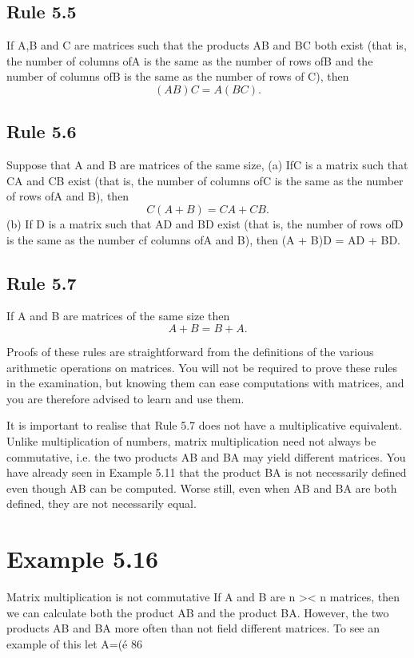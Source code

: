 ﻿\documentclass{beamer}
\begin{document}
\subsection{Rule 5.5} If A,B and C are matrices such that the products AB and BC
both exist (that is, the number of columns ofA is the same as the
number of rows ofB and the number of columns ofB is the same as
the number of rows of C), then
\[(AB)C = A(BC).\]
\subsection{Rule 5.6} Suppose that A and B are matrices of the same size,
(a) IfC is a matrix such that CA and CB exist (that is, the number of
columns ofC is the same as the number of rows ofA and B), then
\[C(A+ B) = CA+CB.\]
(b) If D is a matrix such that AD and BD exist (that is, the number
of rows ofD is the same as the number cf columns ofA and B),
then
(A + B)D = AD + BD.
\subsection{Rule 5.7} If A and B are matrices of the same size then
\[A + B = B + A.\]

Proofs of these rules are straightforward from the deﬁnitions of the
various arithmetic operations on matrices. You will not be required
to prove these rules in the examination, but knowing them can ease
computations with matrices, and you are therefore advised to learn
and use them.

It is important to realise that Rule 5.7 does not have a multiplicative
equivalent. Unlike multiplication of numbers, matrix multiplication
need not always be commutative, i.e. the two products AB and BA
may yield different matrices. You have already seen in Example 5.11
that the product BA is not necessarily deﬁned even though AB can
be computed. Worse still, even when AB and BA are both deﬁned,
they are not necessarily equal.

\section{Example 5.16} Matrix multiplication is not commutative
If A and B are n >< n matrices, then we can calculate both the
product AB and the product BA. However, the two products AB
and BA more often than not ﬁeld different matrices. To see an
example of this let
A=(é %
86
\end{document}
